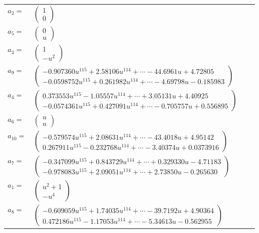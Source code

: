 \documentclass[1p]{elsarticle_modified}
\theoremstyle{definition}
\begin{document}
\begin{tabular}{m{7pt} m{180pt} m{7pt} m{180pt} }
\flushright $a_{2}=$&$\begin{pmatrix}1\\0\end{pmatrix}$ \\
\flushright $a_{5}=$&$\begin{pmatrix}0\\u\end{pmatrix}$ \\
\flushright $a_{3}=$&$\begin{pmatrix}1\\- u^2\end{pmatrix}$ \\
\flushright $a_{9}=$&$\begin{pmatrix}-0.907360 u^{115}+2.58106 u^{114}+\cdots-44.6961 u+4.72805\\-0.0598752 u^{115}+0.261982 u^{114}+\cdots-4.69798 u-0.185983\end{pmatrix}$ \\
\flushright $a_{4}=$&$\begin{pmatrix}0.373553 u^{115}-1.05557 u^{114}+\cdots+3.05131 u+4.40925\\-0.0574361 u^{115}+0.427091 u^{114}+\cdots-0.705757 u+0.556895\end{pmatrix}$ \\
\flushright $a_{6}=$&$\begin{pmatrix}u\\u\end{pmatrix}$ \\
\flushright $a_{10}=$&$\begin{pmatrix}-0.579574 u^{115}+2.08631 u^{114}+\cdots-43.4018 u+4.95142\\0.267911 u^{115}-0.232768 u^{114}+\cdots-3.40374 u+0.0373916\end{pmatrix}$ \\
\flushright $a_{7}=$&$\begin{pmatrix}-0.347099 u^{115}+0.843729 u^{114}+\cdots+0.329330 u-4.71183\\-0.978083 u^{115}+2.09051 u^{114}+\cdots+2.73850 u-0.265630\end{pmatrix}$ \\
\flushright $a_{1}=$&$\begin{pmatrix}u^2+1\\- u^4\end{pmatrix}$ \\
\flushright $a_{8}=$&$\begin{pmatrix}-0.609059 u^{115}+1.74035 u^{114}+\cdots-39.7192 u+4.90364\\0.472186 u^{115}-1.17053 u^{114}+\cdots-5.34613 u-0.562955\end{pmatrix}$ \\

\end{tabular}
\end{document}
